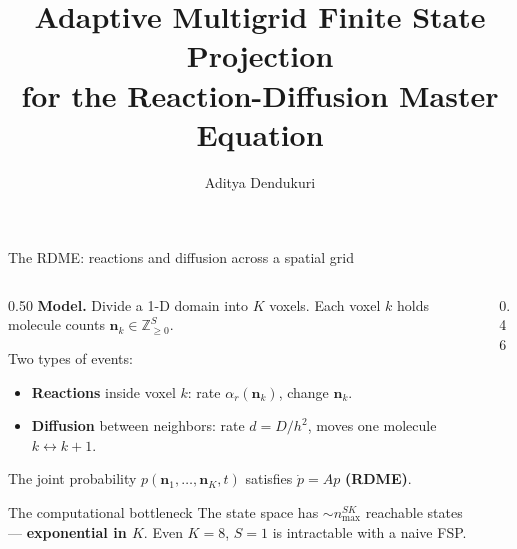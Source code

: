 \documentclass[10pt,aspectratio=169]{beamer}
\title[Adaptive Multigrid FSP]{%
  Adaptive Multigrid Finite State Projection\\
  for the Reaction-Diffusion Master Equation}
\author{Aditya Dendukuri}
\institute[UCSB]{University of California, Santa Barbara}
\date{}
\begin{document}
\begin{frame}
  \titlepage
\end{frame}



\begin{frame}{The RDME: reactions and diffusion across a spatial grid}

  \begin{columns}[T]
    \begin{column}{0.50\textwidth}
      \textbf{Model.}
      Divide a 1-D domain into $K$ voxels.
      Each voxel $k$ holds molecule counts $\mathbf{n}_k \in \mathbb{Z}_{\geq 0}^S$.

      \medskip
      Two types of events:
      \begin{itemize}\setlength\itemsep{0.4em}
        \item \textcolor{slowred}{\textbf{Reactions}} inside voxel $k$:
              rate $\alpha_r(\mathbf{n}_k)$, change $\mathbf{n}_k$.
        \item \textcolor{fastblue}{\textbf{Diffusion}} between neighbors:
              rate $d = D/h^2$, moves one molecule $k \leftrightarrow k{+}1$.
      \end{itemize}

      \medskip
      The joint probability $p(\mathbf{n}_1,\ldots,\mathbf{n}_K,t)$
      satisfies $\dot p = A p$ \textbf{(RDME)}.

      \medskip
      \begin{alertblock}{The computational bottleneck}
        The state space has $\sim n_{\max}^{SK}$ reachable states —
        \textbf{exponential in $K$}.
        Even $K{=}8$, $S{=}1$ is intractable with a naive FSP.
      \end{alertblock}
    \end{column}
    \begin{column}{0.46\textwidth}
      \begin{center}
\end{center}
\end{column}
\end{columns}
\end{frame}
\end{document}
